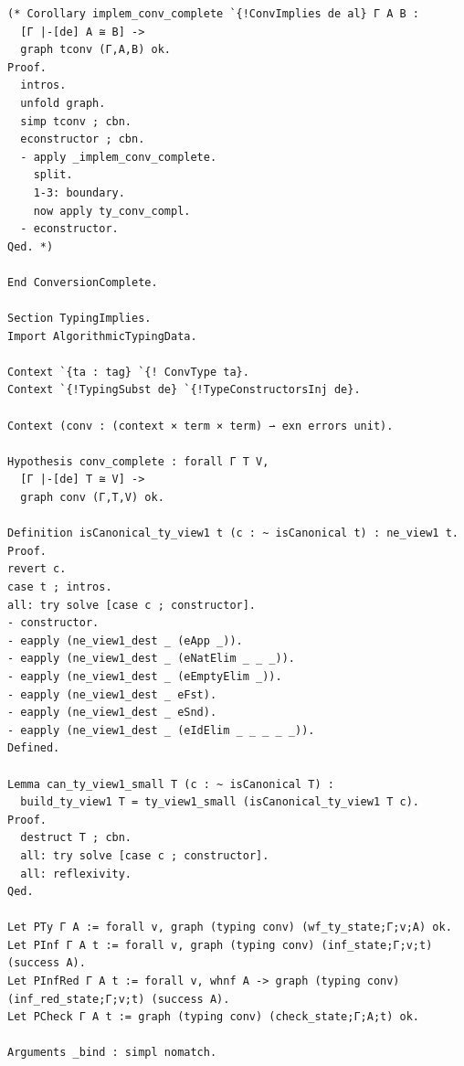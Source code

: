 \begin{lstlisting}
(* Corollary implem_conv_complete `{!ConvImplies de al} Γ A B :
  [Γ |-[de] A ≅ B] ->
  graph tconv (Γ,A,B) ok.
Proof.
  intros.
  unfold graph.
  simp tconv ; cbn.
  econstructor ; cbn.
  - apply _implem_conv_complete.
    split.
    1-3: boundary.
    now apply ty_conv_compl.
  - econstructor.
Qed. *)

End ConversionComplete.

Section TypingImplies.
Import AlgorithmicTypingData.

Context `{ta : tag} `{! ConvType ta}.
Context `{!TypingSubst de} `{!TypeConstructorsInj de}.

Context (conv : (context × term × term) ⇀ exn errors unit).

Hypothesis conv_complete : forall Γ T V,
  [Γ |-[de] T ≅ V] ->
  graph conv (Γ,T,V) ok.

Definition isCanonical_ty_view1 t (c : ~ isCanonical t) : ne_view1 t.
Proof.
revert c.
case t ; intros.
all: try solve [case c ; constructor].
- constructor.
- eapply (ne_view1_dest _ (eApp _)).
- eapply (ne_view1_dest _ (eNatElim _ _ _)).
- eapply (ne_view1_dest _ (eEmptyElim _)).
- eapply (ne_view1_dest _ eFst).
- eapply (ne_view1_dest _ eSnd).
- eapply (ne_view1_dest _ (eIdElim _ _ _ _ _)).
Defined.

Lemma can_ty_view1_small T (c : ~ isCanonical T) :
  build_ty_view1 T = ty_view1_small (isCanonical_ty_view1 T c).
Proof.
  destruct T ; cbn.
  all: try solve [case c ; constructor].
  all: reflexivity.
Qed.

Let PTy Γ A := forall v, graph (typing conv) (wf_ty_state;Γ;v;A) ok.
Let PInf Γ A t := forall v, graph (typing conv) (inf_state;Γ;v;t) (success A).
Let PInfRed Γ A t := forall v, whnf A -> graph (typing conv) (inf_red_state;Γ;v;t) (success A).
Let PCheck Γ A t := graph (typing conv) (check_state;Γ;A;t) ok.

Arguments _bind : simpl nomatch.


\end{lstlisting}
